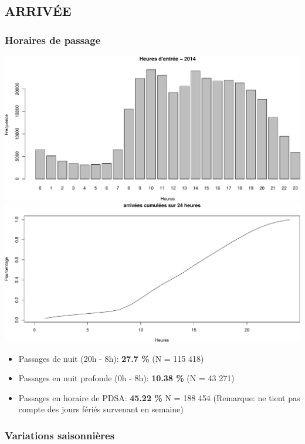 \documentclass[]{article}
\begin{document}
\subsection{ARRIVÉE}\label{arrivee}

\subsubsection{Horaires de passage}\label{horaires-de-passage}

\includegraphics{Figs/horaires-1.pdf}
\includegraphics{Figs/horaires-2.pdf}

\begin{itemize}
\item
  Passages de nuit (20h - 8h): \textbf{27.7 \%} (N = 115 418)
\item
  Passages en nuit profonde (0h - 8h): \textbf{10.38 \%} (N = 43 271)
\item
  Passages en horaire de PDSA: \textbf{45.22 \%} N = 188 454 (Remarque:
  ne tient pas compte des jours fériés survenant en semaine)
\end{itemize}

\subsubsection{Variations saisonnières}\label{variations-saisonnieres}
\end{document}
